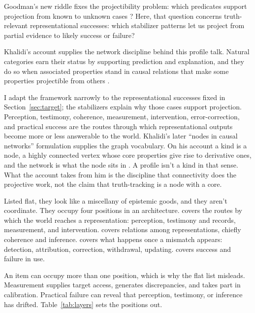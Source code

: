 \documentclass[12pt]{article}
\begin{document}
Goodman's new riddle fixes the projectibility problem: which predicates support
projection from known to unknown cases \citep{Goodman1955}? Here, that question concerns
truth-relevant representational successes: which stabilizer patterns let us project from
partial evidence to likely success or failure?

Khalidi's account supplies the network discipline behind this profile talk. Natural
categories earn their status by supporting prediction and explanation, and they do so
when associated properties stand in causal relations that make some properties
projectible from others \citep{khalidi2013}.

I adapt the framework narrowly to the representational successes fixed in
Section~\ref{sec:target}; the stabilizers explain why those cases support projection.
Perception, testimony, coherence, measurement, intervention, error-correction, and
practical success are the routes through which representational outputs become more or
less answerable to the world. Khalidi's later \enquote{nodes in causal networks}
formulation supplies the graph vocabulary. On
his account a kind is a node, a highly connected vertex whose core properties give rise to
derivative ones, and the network is what the node sits in
\citep{khalidi_2018_natural_kinds_nodes_causal_networks}. A profile isn't a kind in that
sense. What the account takes from him is the discipline that connectivity does the
projective work, not the claim that truth-tracking is a node with a core.

Listed flat, they look like a miscellany of epistemic goods, and they aren't coordinate.
They occupy four positions in an architecture.  covers the routes by
which the world reaches a representation: perception, testimony and records, measurement,
and intervention.  covers relations among representations, chiefly
coherence and inference.  covers what happens once a mismatch
appears: detection, attribution, correction, withdrawal, updating.  covers success and failure in use.

An item can occupy more than one position, which is why the flat list misleads.
Measurement supplies target access, generates discrepancies, and takes part in
calibration. Practical failure can reveal that perception, testimony, or inference has
drifted. Table~\ref{tab:layers} sets the positions out.
\end{document}
